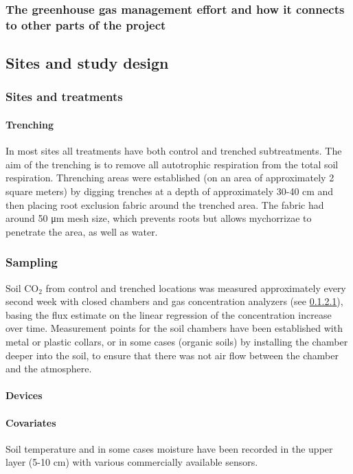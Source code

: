 \documentclass[12pt,a4paper]{article}
\begin{document}
\subsubsection{The greenhouse gas management effort and how it connects to other parts of the project}




\subsection{Sites and study design}

\subsubsection{Sites and treatments}

\paragraph{Trenching}
In most sites all treatments have both control and trenched subtreatments. The aim of the trenching is to remove all autotrophic respiration from the total soil respiration. Threnching areas were established (on an area of approximately 2 square meters) by digging trenches at a depth of approximately 30-40 cm and then placing root exclusion fabric around the trenched area. The fabric had around 50 μm mesh size, which prevents roots but allows mychorrizae to penetrate the area, as well as water.

\subsubsection{Sampling}
Soil CO$_2$ from control and trenched locations was measured approximately every second week with closed chambers and gas concentration analyzers (see \ref{par:devices}), basing the flux estimate on the linear regression of the concentration increase over time.
Measurement points for the soil chambers have been established with metal or plastic collars, or in some cases (organic soils) by installing the chamber deeper into the soil, to ensure that there was not air flow between the chamber and the atmosphere.

\paragraph{Devices}\label{par:devices}


\paragraph{Covariates}
Soil temperature and in some cases moisture have been recorded in the upper layer (5-10 cm) with various commercially available sensors.
\end{document}
